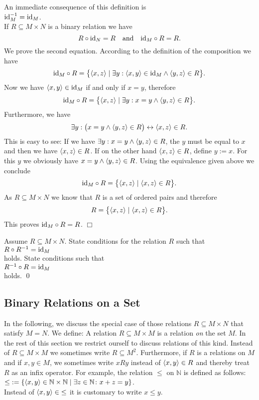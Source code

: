 \noindent
An immediate consequence of this definition is \\[0.2cm]
\hspace*{1.3cm} $\textrm{id}_M^{-1} = \textrm{id}_M$. \\[0.2cm]
If  $R \subseteq M \times N$ is a binary relation we have 
\[ R \circ \textrm{id}_N = R \quad \mbox{and} \quad \textrm{id}_M \circ R = R. \] 
We prove the second equation.  According to the definition of the composition we have
\[ \id_M \circ R = \bigl\{ \pair(x,z) \mid \exists y: \pair(x,y) \in \id_M \wedge \pair(y,z) \in R \bigr\}. \]
Now we have $\pair(x,y) \in \id_M$ if and only if  $x = y$, therefore
\[ \id_M \circ R = \bigl\{ \pair(x,z) \mid \exists y: x = y \wedge \pair(y,z) \in R \bigr\}. \]
Furthermore, we have
\[ \exists y: \bigl( x = y \wedge \pair(y,z) \in R \bigr) \leftrightarrow \pair(x,z) \in R. \]
This is easy to see:  If we have $\exists y: x = y \wedge \pair(y,z) \in R$,
the $y$ must be equal to  $x$ and then we have  $\pair(x,z) \in R$.  If on the other hand
 $\pair(x,z) \in R$, define $y := x$.  For this $y$ we obviously have 
$x = y \wedge \pair(y,z) \in R$.  Using the equivalence given above we conclude 
\[ \id_M \circ R = \bigl\{ \pair(x,z) \mid \pair(x,z) \in R \bigr\}. \]
As  $R \subseteq M \times N$ we know that $R$ is a set of ordered pairs and therefore
\[ R = \bigl\{ \pair(x,z) \mid \pair(x,z) \in R \bigr\}. \]
This proves $\textrm{id}_M \circ R = R$. \hspace*{\fill} $\Box$
\vspace*{0.2cm}

\exercise
Assume $R \subseteq M \times N$.  State conditions for the relation $R$ such that
\\[0.2cm]
\hspace*{1.3cm}
$R \circ R^{-1} = \textrm{id}_M$  
\\[0.2cm]
holds.  State conditions such that 
\\[0.2cm]
\hspace*{1.3cm}
$R^{-1} \circ R = \textrm{id}_M$
\\[0.2cm]
holds.  \qed
\pagebreak


\subsection{Binary Relations on a Set}
In the following, we discuss the special case of those relations $R \subseteq M \times N$
that satisfy  $M = N$.  We define: A relation $R \subseteq M \times M$ is a  relation
\emph{on} the set $M$. In the rest of this section we restrict ourself to discuss
relations of this kind.  Instead of $R \subseteq M \times M$ we sometimes write $R \subseteq M^2$.
Furthermore, if $R$ is a relations on  $M$ and if $x, y \in M$, we sometimes write $x R y$ instead of 
$\pair(x,y) \in R$ and thereby treat $R$ as an infix operator.  For example, the relation $\leq$ 
on  $\mathbb{N}$ is defined as follows: \\[0.2cm]
\hspace*{1.3cm}
 $\leq\; := \{ \pair(x,y) \in \mathbb{N} \times \mathbb{N} \mid \exists z \in \mathbb{N} \colon x + z = y \}$.
\\[0.2cm]
Instead of  $\pair(x,y) \in\; \leq$ it is customary to write $x \leq y$.
  
